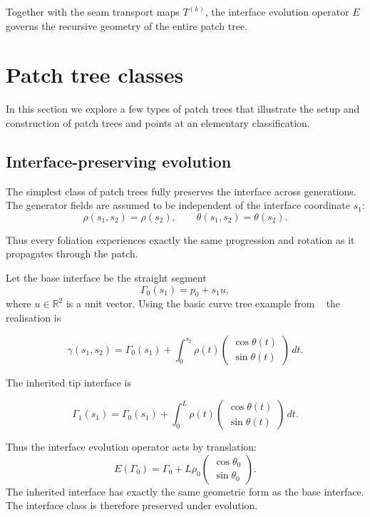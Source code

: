 \documentclass[11pt,a4paper]{article}
\begin{document}
Together with the seam transport maps $T^{(k)}$, the interface evolution operator $E$
governs the recursive geometry of the entire patch tree.

\section{Patch tree classes}
\label{sec:examples}

In this section we explore a few types of patch trees that illustrate the setup 
and construction of patch trees and points at an elementary classification.

\subsection{Interface-preserving evolution}
\label{sec:uniform}

The simplest class of patch trees fully preserves the interface across generations.
The generator fields are assumed to be independent of the interface
coordinate $s_1$:
\[
    \rho(s_1,s_2) = \rho(s_2), \qquad
    \theta(s_1,s_2) = \theta(s_2).
\]

Thus every foliation experiences exactly the same progression and rotation 
as it propagates through the patch. 

Let the base interface be the straight segment
\[
    \Gamma_0(s_1) = p_0 + s_1u,
\]
where $u \in \mathbb{R}^2$ is a unit vector. Using the basic curve tree example from 
~\cite{mulder2026} the realisation is

\[
    \gamma(s_1,s_2)
    =
    \Gamma_0(s_1)
    +
    \int_0^{s_2}
    \rho(t)
    \begin{pmatrix}
        \cos\theta(t)\\
        \sin\theta(t)
    \end{pmatrix}
    \, dt.
\]

The inherited tip interface is

\[
    \Gamma_1(s_1)
    =
    \Gamma_0(s_1)
    +
    \int_0^{L}
    \rho(t)
    \begin{pmatrix}
        \cos\theta(t)\\
        \sin\theta(t)
    \end{pmatrix}
    \, dt.
\]

Thus the interface evolution operator acts by translation:
\[
    E(\Gamma_0)
    =
    \Gamma_0
    +
    L\rho_0
    \begin{pmatrix}
        \cos\theta_0\\
        \sin\theta_0
    \end{pmatrix}.
\]
The inherited interface has exactly the same geometric form as the
base interface. The interface class is therefore preserved under
evolution.
\end{document}

